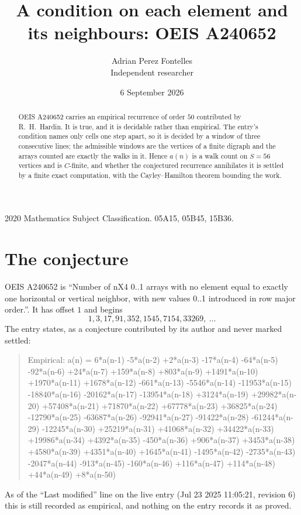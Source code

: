 \documentclass[11pt,a4paper]{article}
\title{A condition on each element and its neighbours: OEIS A240652}
\author{Adrian Perez Fontelles\\ \small Independent researcher}
\date{6 September 2026}
\theoremstyle{plain}
\theoremstyle{definition}
\begin{document}
\maketitle

\begin{abstract}
OEIS A240652 carries an empirical recurrence of order $50$ contributed by R.~H.~Hardin. It is
true, and it is decidable rather than empirical. The entry's condition names only cells one step apart, so it is decided by a window of
three consecutive lines; the
admissible windows are the vertices of a finite digraph and the arrays counted are exactly the
walks in it. Hence $a(n)$ is a walk count on $S=56$ vertices and is $C$-finite, and whether the
conjectured recurrence annihilates it is settled by a finite exact computation, with the
Cayley--Hamilton theorem bounding the work.
\end{abstract}

\noindent\small 2020 Mathematics Subject Classification. 05A15, 05B45, 15B36.\normalsize

\section{The conjecture}

OEIS A240652 is ``Number of nX4 0..1 arrays with no element equal to exactly one horizontal or vertical neighbor, with new values 0..1 introduced in row major order.''. It has offset $1$ and begins
\[
1, 3, 17, 91, 352, 1545, 7154, 33269,\ \dots
\]
The entry states, as a conjecture contributed by its author and never marked settled:
\begin{quote}
Empirical: a(n) = 6*a(n-1) -5*a(n-2) +2*a(n-3) -17*a(n-4) -64*a(n-5) -92*a(n-6) +24*a(n-7) +159*a(n-8) +803*a(n-9) +1491*a(n-10) +1970*a(n-11) +1678*a(n-12) -661*a(n-13) -5546*a(n-14) -11953*a(n-15) -18840*a(n-16) -20162*a(n-17) -13954*a(n-18) +3124*a(n-19) +29982*a(n-20) +57408*a(n-21) +71870*a(n-22) +67778*a(n-23) +36825*a(n-24) -12790*a(n-25) -63687*a(n-26) -92941*a(n-27) -91422*a(n-28) -61244*a(n-29) -12245*a(n-30) +25219*a(n-31) +41068*a(n-32) +34422*a(n-33) +19986*a(n-34) +4392*a(n-35) -450*a(n-36) +906*a(n-37) +3453*a(n-38) +4580*a(n-39) +4351*a(n-40) +1645*a(n-41) -1495*a(n-42) -2735*a(n-43) -2047*a(n-44) -913*a(n-45) -160*a(n-46) +116*a(n-47) +114*a(n-48) +44*a(n-49) +8*a(n-50)
\end{quote}
As of the ``Last modified'' line on the live entry (Jul 23 2025 11:05:21, revision 6) this is still
recorded as empirical, and nothing on the entry records it as proved.
\end{document}
